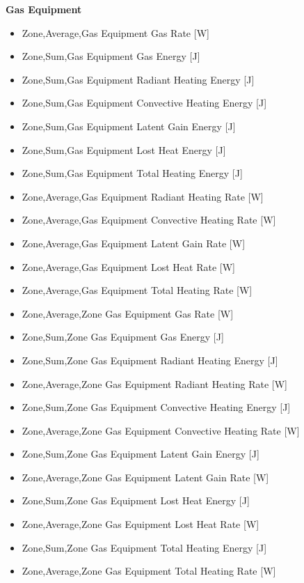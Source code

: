 \textbf{Gas Equipment}

\begin{itemize}
\item
  Zone,Average,Gas Equipment Gas Rate {[}W{]}
\item
  Zone,Sum,Gas Equipment Gas Energy {[}J{]}
\item
  Zone,Sum,Gas Equipment Radiant Heating Energy {[}J{]}
\item
  Zone,Sum,Gas Equipment Convective Heating Energy {[}J{]}
\item
  Zone,Sum,Gas Equipment Latent Gain Energy {[}J{]}
\item
  Zone,Sum,Gas Equipment Lost Heat Energy {[}J{]}
\item
  Zone,Sum,Gas Equipment Total Heating Energy {[}J{]}
\item
  Zone,Average,Gas Equipment Radiant Heating Rate {[}W{]}
\item
  Zone,Average,Gas Equipment Convective Heating Rate {[}W{]}
\item
  Zone,Average,Gas Equipment Latent Gain Rate {[}W{]}
\item
  Zone,Average,Gas Equipment Lost Heat Rate {[}W{]}
\item
  Zone,Average,Gas Equipment Total Heating Rate {[}W{]}
\item
  Zone,Average,Zone Gas Equipment Gas Rate {[}W{]}
\item
  Zone,Sum,Zone Gas Equipment Gas Energy {[}J{]}
\item
  Zone,Sum,Zone Gas Equipment Radiant Heating Energy {[}J{]}
\item
  Zone,Average,Zone Gas Equipment Radiant Heating Rate {[}W{]}
\item
  Zone,Sum,Zone Gas Equipment Convective Heating Energy {[}J{]}
\item
  Zone,Average,Zone Gas Equipment Convective Heating Rate {[}W{]}
\item
  Zone,Sum,Zone Gas Equipment Latent Gain Energy {[}J{]}
\item
  Zone,Average,Zone Gas Equipment Latent Gain Rate {[}W{]}
\item
  Zone,Sum,Zone Gas Equipment Lost Heat Energy {[}J{]}
\item
  Zone,Average,Zone Gas Equipment Lost Heat Rate {[}W{]}
\item
  Zone,Sum,Zone Gas Equipment Total Heating Energy {[}J{]}
\item
  Zone,Average,Zone Gas Equipment Total Heating Rate {[}W{]}
\end{itemize}


